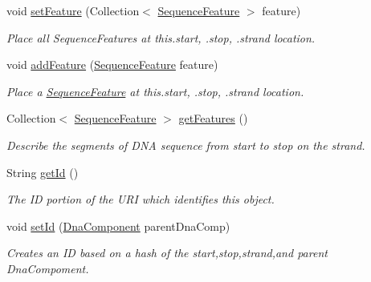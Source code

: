 \begin{DoxyCompactItemize}
\item 
void \hyperlink{classorg_1_1sbolstandard_1_1lib_s_b_o_lj_1_1_sequence_annotation_aa40e1d7c8d2e23aee5fac55f8e0fbd4d}{setFeature} (Collection$<$ \hyperlink{classorg_1_1sbolstandard_1_1lib_s_b_o_lj_1_1_sequence_feature}{SequenceFeature} $>$ feature)
\begin{DoxyCompactList}\small\item\em Place all SequenceFeatures at this.start, .stop, .strand location. \item\end{DoxyCompactList}\item 
void \hyperlink{classorg_1_1sbolstandard_1_1lib_s_b_o_lj_1_1_sequence_annotation_a8606f263fb4a3f3d9d7265cf1d1095d3}{addFeature} (\hyperlink{classorg_1_1sbolstandard_1_1lib_s_b_o_lj_1_1_sequence_feature}{SequenceFeature} feature)
\begin{DoxyCompactList}\small\item\em Place a \hyperlink{classorg_1_1sbolstandard_1_1lib_s_b_o_lj_1_1_sequence_feature}{SequenceFeature} at this.start, .stop, .strand location. \item\end{DoxyCompactList}\item 
Collection$<$ \hyperlink{classorg_1_1sbolstandard_1_1lib_s_b_o_lj_1_1_sequence_feature}{SequenceFeature} $>$ \hyperlink{classorg_1_1sbolstandard_1_1lib_s_b_o_lj_1_1_sequence_annotation_a6e4112a6cec45766efb5ce852f1e764e}{getFeatures} ()
\begin{DoxyCompactList}\small\item\em Describe the segments of DNA sequence from start to stop on the strand. \item\end{DoxyCompactList}\item 
String \hyperlink{classorg_1_1sbolstandard_1_1lib_s_b_o_lj_1_1_sequence_annotation_aab219518f0eaf3db55b6a62ad6b49407}{getId} ()
\begin{DoxyCompactList}\small\item\em The ID portion of the URI which identifies this object. \item\end{DoxyCompactList}\item 
void \hyperlink{classorg_1_1sbolstandard_1_1lib_s_b_o_lj_1_1_sequence_annotation_acc7f1b4283f0e5a9a502a64403d2e625}{setId} (\hyperlink{classorg_1_1sbolstandard_1_1lib_s_b_o_lj_1_1_dna_component}{DnaComponent} parentDnaComp)
\begin{DoxyCompactList}\small\item\em Creates an ID based on a hash of the start,stop,strand,and parent DnaCompoment. \item\end{DoxyCompactList}\item 

\end{DoxyCompactItemize}
